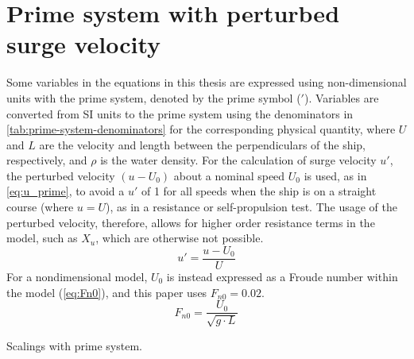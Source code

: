\section{Prime system with perturbed surge velocity} \label{sec:prime_system}
Some variables in the equations in this thesis are expressed using non-dimensional units with the prime system, denoted by the prime symbol ($'$). Variables are converted from SI units to the prime system using the denominators in \autoref{tab:prime-system-denominators} for the corresponding physical quantity, where $U$ and $L$ are the velocity and length between the perpendiculars of the ship, respectively, and $\rho$ is the water density.
For the calculation of surge velocity $u'$, the perturbed velocity $(u-U_0)$ about a nominal speed $U_0$ is used, as in \autoref{eq:u_prime}, to avoid a $u'$ of 1 for all speeds when the ship is on a straight course (where $u=U$), as in a resistance or self-propulsion test. The usage of the perturbed velocity, therefore, allows for higher order resistance terms in the model, such as $X_{u}$, which are otherwise not possible. 
\begin{equation}
    \label{eq:u_prime}
    u' = \frac{u-U_0}{U}
\end{equation}
For a nondimensional model, $U_0$ is instead expressed as a Froude number within the model (\autoref{eq:Fn0}), and this paper uses $F_{n0}=0.02$.
\begin{equation}
    \label{eq:Fn0}
    F_{n0} = \frac{U_0}{\sqrt{g \cdot L}}
\end{equation}
\begin{table}[h]
    \centering
    \caption{Scalings with prime system.}
    \label{tab:prime-system-denominators}
\end{table}